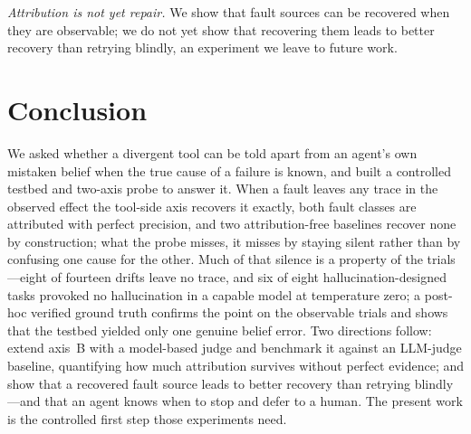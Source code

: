 \documentclass[runningheads]{llncs}
\begin{document}
\smallskip\noindent\emph{Attribution is not yet repair.} We show that fault sources can be recovered when they are observable; we do not yet show that recovering them leads to better recovery than retrying blindly, an experiment we leave to future work.

\section{Conclusion}
\label{sec:conclusion}

We asked whether a divergent tool can be told apart from an agent's own mistaken belief when the true cause of a failure is known, and built a controlled testbed and two-axis probe to answer it. When a fault leaves any trace in the observed effect the tool-side axis recovers it exactly, both fault classes are attributed with perfect precision, and two attribution-free baselines recover none by construction; what the probe misses, it misses by staying silent rather than by confusing one cause for the other. Much of that silence is a property of the trials---eight of fourteen drifts leave no trace, and six of eight hallucination-designed tasks provoked no hallucination in a capable model at temperature zero; a post-hoc verified ground truth confirms the point on the observable trials and shows that the testbed yielded only one genuine belief error. Two directions follow: extend axis~B with a model-based judge and benchmark it against an LLM-judge baseline, quantifying how much attribution survives without perfect evidence; and show that a recovered fault source leads to better recovery than retrying blindly---and that an agent knows when to stop and defer to a human. The present work is the controlled first step those experiments need.
\end{document}
